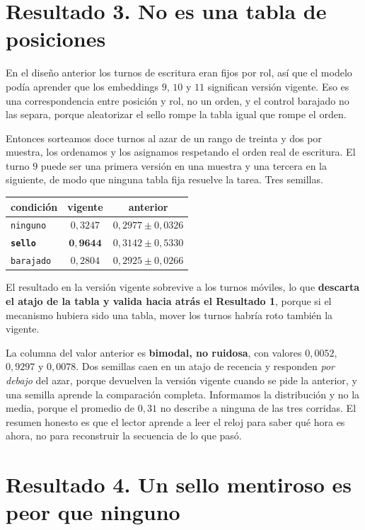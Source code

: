 \documentclass[11pt,a4paper]{article}
\begin{document}
\section{Resultado 3. No es una tabla de posiciones}

En el diseño anterior los turnos de escritura eran fijos por rol, así que el modelo podía aprender que
los embeddings $9$, $10$ y $11$ significan versión vigente. Eso es una correspondencia entre posición y
rol, no un orden, y el control barajado no las separa, porque aleatorizar el sello rompe la tabla igual
que rompe el orden.

Entonces sorteamos doce turnos al azar de un rango de treinta y dos por muestra, los ordenamos y los
asignamos respetando el orden real de escritura. El turno $9$ puede ser una primera versión en una
muestra y una tercera en la siguiente, de modo que ninguna tabla fija resuelve la tarea. Tres semillas.

\begin{center}
\begin{tabular}{lcc}
\toprule
condición & \textbf{vigente} & anterior \\
\midrule
\texttt{ninguno} & $0{,}3247$ & $0{,}2977 \pm 0{,}0326$ \\
\textbf{\texttt{sello}} & $\mathbf{0{,}9644}$ & $0{,}3142 \pm 0{,}5330$ \\
\texttt{barajado} & $0{,}2804$ & $0{,}2925 \pm 0{,}0266$ \\
\bottomrule
\end{tabular}
\end{center}

El resultado en la versión vigente sobrevive a los turnos móviles, lo que \textbf{descarta el atajo de
la tabla y valida hacia atrás el Resultado 1}, porque si el mecanismo hubiera sido una tabla, mover los
turnos habría roto también la vigente.

La columna del valor anterior es \textbf{bimodal, no ruidosa}, con valores $0{,}0052$, $0{,}9297$ y
$0{,}0078$. Dos semillas caen en un atajo de recencia y responden \emph{por debajo} del azar, porque
devuelven la versión vigente cuando se pide la anterior, y una semilla aprende la comparación completa.
Informamos la distribución y no la media, porque el promedio de $0{,}31$ no describe a ninguna de las
tres corridas. El resumen honesto es que el lector aprende a leer el reloj para saber qué hora es
ahora, no para reconstruir la secuencia de lo que pasó.

\section{Resultado 4. Un sello mentiroso es peor que ninguno}
\end{document}

